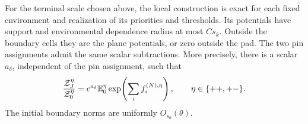 \begin{lemma}
\label{lem:boundary-exactness}
For the terminal scale chosen above, the local construction is exact
for each fixed environment and realization of its priorities and
thresholds.  Its potentials have support and environmental dependence
radius at most $Cs_k$.  Outside the
boundary cells they are the plane potentials, or zero outside the pad.
The two pin assignments admit the same scalar subtractions.  More
precisely, there is a scalar $a_\delta$, independent of the pin
assignment, such that
\begin{equation}\label{eq:polygon-exact-partition}
 \frac{\mathcal Z_J^\eta}{\mathcal Z_0^\eta}
 =e^{a_\delta}\mathbb E_0^\eta
       \exp\!\left(\sum_i f_i^{(N),\eta}\right),
 \qquad \eta\in\{++, +-\}.
\end{equation}
The initial boundary norms are uniformly $O_{s_0}(\theta)$.
\end{lemma}

